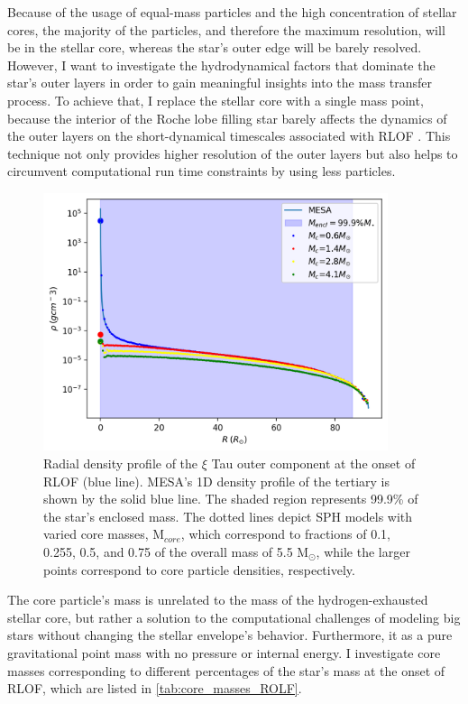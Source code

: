 Because of the usage of equal-mass particles and the high concentration of stellar cores, the majority of the particles, and therefore the maximum resolution, will be in the stellar core, whereas the star's outer edge will be barely resolved. However, I want to investigate the hydrodynamical factors that dominate the star's outer layers in order to gain meaningful insights into the mass transfer process. To achieve that, I replace the stellar core with a single mass point, because the interior of the Roche lobe filling star barely affects the dynamics of the outer layers on the short-dynamical timescales associated with RLOF \citep{deupree2005structure}.  This technique not only provides higher resolution of the outer layers but also helps to circumvent computational run time constraints by using less particles.
\begin{figure}[H]
    \centering
    \includegraphics[width=0.9\textwidth]{Thesis/graphs/ROLF_density_profile.pdf}
    \caption{Radial density profile of the  $\xi$ Tau outer component at the onset of RLOF (blue line). MESA's 1D density profile of the tertiary is shown by the solid blue line. The shaded region represents 99.9\% of the star's enclosed mass. The dotted lines depict SPH models with varied core masses, M$_{core}$, which correspond to fractions of 0.1, 0.255, 0.5, and 0.75 of the overall mass of 5.5 M$_{\odot}$, while the larger points correspond to core particle densities, respectively.}
    \label{fig:stellar_density_ROLF}
\end{figure}
The core particle's mass is unrelated to the mass of the hydrogen-exhausted stellar core, but rather a solution to the computational challenges of modeling big stars without changing the stellar envelope's behavior. Furthermore, it as a pure gravitational point mass with no pressure or internal energy. I investigate core masses corresponding to different percentages of the star's mass at the onset of RLOF, which are listed in \cref{tab:core_masses_ROLF}. 
